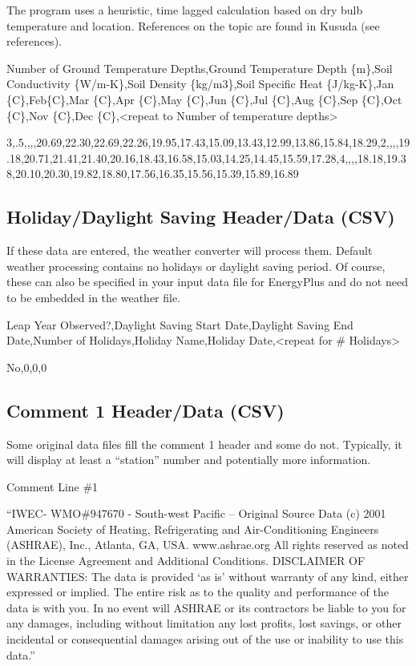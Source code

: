 The program uses a heuristic, time lagged calculation based on dry bulb temperature and location. References on the topic are found in Kusuda (see references).

Number of Ground Temperature Depths,Ground Temperature Depth \{m\},Soil Conductivity \{W/m-K\},Soil Density \{kg/m3\},Soil Specific Heat \{J/kg-K\},Jan \{C\},Feb\{C\},Mar \{C\},Apr \{C\},May \{C\},Jun \{C\},Jul \{C\},Aug \{C\},Sep \{C\},Oct \{C\},Nov \{C\},Dec \{C\},\textless{}repeat to Number of temperature depths\textgreater{}

3,.5,,,,20.69,22.30,22.69,22.26,19.95,17.43,15.09,13.43,12.99,13.86,15.84,18.29,2,,,,19.18,20.71,21.41,21.40,20.16,18.43,16.58,15.03,14.25,14.45,15.59,17.28,4,,,,18.18,19.38,20.10,20.30,19.82,18.80,17.56,16.35,15.56,15.39,15.89,16.89

\subsection{Holiday/Daylight Saving Header/Data (CSV)}\label{holidaydaylight-saving-headerdata-csv}

If these data are entered, the weather converter will process them. Default weather processing contains no holidays or daylight saving period. Of course, these can also be specified in your input data file for EnergyPlus and do not need to be embedded in the weather file.

Leap Year Observed?,Daylight Saving Start Date,Daylight Saving End Date,Number of Holidays,Holiday Name,Holiday Date,\textless{}repeat for \# Holidays\textgreater{}

No,0,0,0

\subsection{Comment 1 Header/Data (CSV)}\label{comment-1-headerdata-csv}

Some original data files fill the comment 1 header and some do not. Typically, it will display at least a ``station'' number and potentially more information.

Comment Line \#1

``IWEC- WMO\#947670 - South-west Pacific -- Original Source Data (c) 2001 American Society of Heating, Refrigerating and Air-Conditioning Engineers (ASHRAE), Inc., Atlanta, GA, USA. www.ashrae.org All rights reserved as noted in the License Agreement and Additional Conditions. DISCLAIMER OF WARRANTIES: The data is provided `as is' without warranty of any kind, either expressed or implied. The entire risk as to the quality and performance of the data is with you. In no event will ASHRAE or its contractors be liable to you for any damages, including without limitation any lost profits, lost savings, or other incidental or consequential damages arising out of the use or inability to use this data.''

